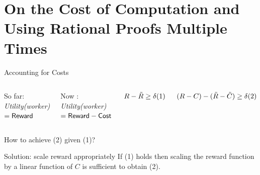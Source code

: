 \section{On the Cost of Computation and Using Rational Proofs Multiple Times}

\begin{frame}{Accounting for Costs}
	\begin{columns}
	\begin{block}{So far:}
		\textit{Utility(worker)} $ = \mathsf{Reward}$
	\end{block}
	\begin{block}{Now :}
		\textit{Utility(worker)} $= \mathsf{Reward} - \mathsf{Cost}$
	\end{block}
	\begin{block}{}
		$R - \tilde{R} \geq \delta \hspace*{\fill} (1) \hspace*{\fill}$
	\end{block}
	\begin{block}{}
		$(R-C) - (\tilde{R}-\tilde{C}) \geq \delta \hspace*{\fill} (2) \hspace*{\fill}$			
	\end{block}
	\end{columns}
	\bigskip
\begin{block}{How to achieve (2) given (1)?}
\end{block}
	\begin{block}{Solution: scale reward appropriately}
		If (1) holds then scaling the reward function by a linear function of $C$ is sufficient to obtain (2).
	\end{block}
\end{frame}

